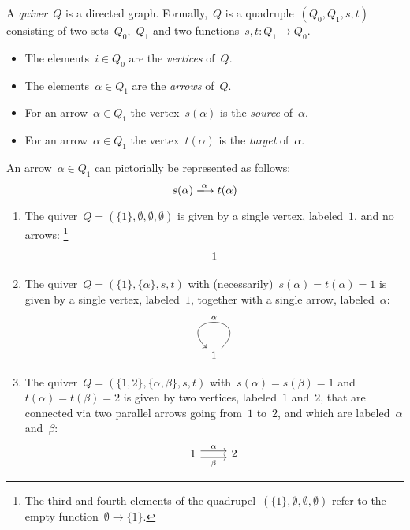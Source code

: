 \begin{definition}
  A \emph{quiver}~$Q$ is a directed graph.
  Formally,~$Q$ is a quadruple~$(Q_0, Q_1, s, t)$ consisting of two sets~$Q_0$,~$Q_1$ and two functions~$s, t \colon Q_1 \to Q_0$.
  \begin{itemize}
    \item
      The elements~$i \in Q_0$ are the \emph{vertices} of~$Q$.
    \item
      The elements~$\alpha \in Q_1$ are the \emph{arrows} of~$Q$.
    \item
      For an arrow~$\alpha \in Q_1$ the vertex~$s(\alpha)$ is the \emph{source} of~$\alpha$.
    \item
      For an arrow~$\alpha \in Q_1$ the vertex~$t(\alpha)$ is the \emph{target} of~$\alpha$.
  \end{itemize}
  An arrow~$\alpha \in Q_1$ can pictorially be represented as follows:
  \[
    s(\alpha)
    \xlongto{\alpha}
    t(\alpha)
  \]
\end{definition}


\begin{example}
  \label{quivers first examples}
  \leavevmode
  \begin{enumerate}
    \item
      The quiver~$Q = (\{1\}, \emptyset, \emptyset, \emptyset)$ is given by a single vertex, labeled~$1$, and no arrows:%
      \footnote{The third and fourth elements of the quadrupel~$(\{1\}, \emptyset, \emptyset, \emptyset)$ refer to the empty function~$\emptyset \to \{1\}$.}
      \[
        \begin{tikzcd}
          1
        \end{tikzcd}
      \]
    \item
      The quiver~$Q = (\{1\}, \{\alpha\}, s, t)$ with (necessarily)~$s(\alpha) = t(\alpha) = 1$ is given by a single vertex, labeled~$1$, together with a single arrow, labeled~$\alpha$:
      \[
        \begin{tikzcd}
          1
          \arrow[loop]{r}[above]{\alpha}
        \end{tikzcd}
      \]
    \item
      The quiver~$Q = (\{1, 2\}, \{\alpha, \beta\}, s, t)$ with~$s(\alpha) = s(\beta) = 1$ and~$t(\alpha) = t(\beta) = 2$ is given by two vertices, labeled~$1$ and~$2$, that are connected via two parallel arrows going from~$1$ to~$2$, and which are labeled~$\alpha$ and~$\beta$:
      \[
        \begin{tikzcd}
            1
            \arrow[shift left = 0.3em]{r}[above]{\alpha}
            \arrow[shift right = 0.3em]{r}[below]{\beta}
          & 2
        \end{tikzcd}
      \]
  \end{enumerate}
\end{example}


